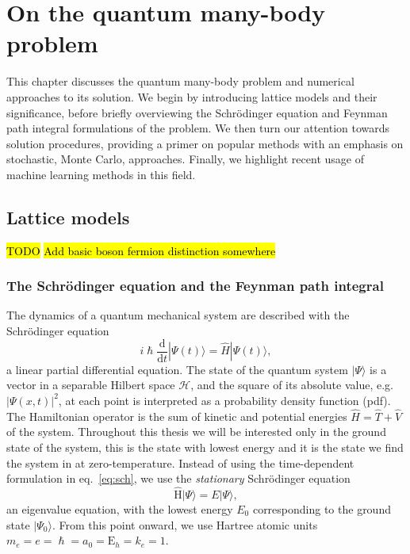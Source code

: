 
\chapter{On the quantum many-body problem}
\label{chapter2}
This chapter discusses the quantum many-body problem and numerical approaches to its solution. We begin by introducing lattice models and their significance, before briefly overviewing the Schr\" odinger equation and Feynman path integral formulations of the problem. We then turn our attention towards solution procedures, providing a primer on popular methods with an emphasis on stochastic, Monte Carlo, approaches. Finally, we highlight recent usage of machine learning methods in this field.

\ifpdf
    \graphicspath{{Chapter2/Figs/Raster/}{Chapter2/Figs/PDF/}{Chapter2/Figs/}}
\else
    \graphicspath{{Chapter2/Figs/Vector/}{Chapter2/Figs/}}
\fi

\section{Lattice models}
\label{sec:lattice-models}
\hl{TODO}
\hl{Add basic boson fermion distinction somewhere}

\subsection{The Schr{\"o}dinger equation and the Feynman path integral}
\label{subsec:latt-qm}
The dynamics of a quantum mechanical system are described with the Schr\" odinger equation
\begin{equation}
	\label{eq:sch}
	i \hslash \frac{\mathrm{d}}{\mathrm{d} t}|\Psi(t)\rangle=\hat{H}|\Psi(t)\rangle,
\end{equation}
a linear partial differential equation. The state of the quantum system $| \Psi \rangle$ is a vector in a separable Hilbert space $\mathcal{H}$, and the square of its absolute value, e.g. $|\Psi(x, t)|^2$, at each point is interpreted as a probability density function (pdf). The Hamiltonian operator is the sum of kinetic and potential energies $\hat H = \hat T + \hat V$ of the system. Throughout this thesis we will be interested only in the ground state of the system, this is the state with lowest energy and it is the state we find the system in at zero-temperature. Instead of using the time-dependent formulation in eq.~\eqref{eq:sch}, we use the \emph{stationary} Schr\" odinger equation
\begin{equation}
	\hat{\mathrm{H}}|\Psi\rangle=E|\Psi\rangle,
\end{equation}
an eigenvalue equation, with the lowest energy $E_0$ corresponding to the ground state $|\Psi_{0}\rangle$. From this point onward, we use Hartree atomic units $m_{e}=e=\hslash=a_{0}=\mathrm{E}_{h}=k_{e}=1$.

